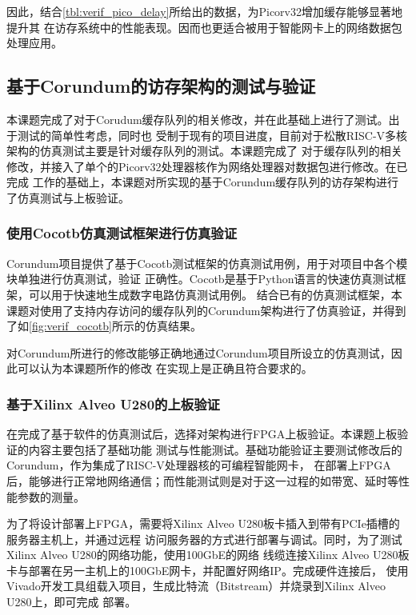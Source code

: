 因此，结合\autoref{tbl:verif_pico_delay}所给出的数据，为Picorv32增加缓存能够显著地提升其
在访存系统中的性能表现。因而也更适合被用于智能网卡上的网络数据包处理应用。

\subsection{基于Corundum的访存架构的测试与验证}

本课题完成了对于Corudum缓存队列的相关修改，并在此基础上进行了测试。出于测试的简单性考虑，同时也
受制于现有的项目进度，目前对于松散RISC-V多核架构的仿真测试主要是针对缓存队列的测试。本课题完成了
对于缓存队列的相关修改，并接入了单个的Picorv32处理器核作为网络处理器对数据包进行修改。在已完成
工作的基础上，本课题对所实现的基于Corundum缓存队列的访存架构进行了仿真测试与上板验证。

\subsubsection{使用Cocotb仿真测试框架进行仿真验证}

Corundum项目提供了基于Cocotb测试框架的仿真测试用例，用于对项目中各个模块单独进行仿真测试，验证
正确性。Cocotb是基于Python语言的快速仿真测试框架，可以用于快速地生成数字电路仿真测试用例\cite{cocotb_doc}。
结合已有的仿真测试框架，本课题对使用了支持内存访问的缓存队列的Corundum架构进行了仿真验证，并得到
了如\autoref{fig:verif_cocotb}所示的仿真结果。


对Corundum所进行的修改能够正确地通过Corundum项目所设立的仿真测试，因此可以认为本课题所作的修改
在实现上是正确且符合要求的。

\subsubsection{基于Xilinx Alveo U280的上板验证}

在完成了基于软件的仿真测试后，选择对架构进行FPGA上板验证。本课题上板验证的内容主要包括了基础功能
测试与性能测试。基础功能验证主要测试修改后的Corundum，作为集成了RISC-V处理器核的可编程智能网卡，
在部署上FPGA后，能够进行正常地网络通信；而性能测试则是对于这一过程的如带宽、延时等性能参数的测量。

为了将设计部署上FPGA，需要将Xilinx Alveo U280板卡插入到带有PCIe插槽的服务器主机上，并通过远程
访问服务器的方式进行部署与调试。同时，为了测试Xilinx Alveo U280的网络功能，使用100GbE的网络
线缆连接Xilinx Alveo U280板卡与部署在另一主机上的100GbE网卡，并配置好网络IP。完成硬件连接后，
使用Vivado开发工具组载入项目，生成比特流（Bitstream）并烧录到Xilinx Alveo U280上，即可完成
部署。

